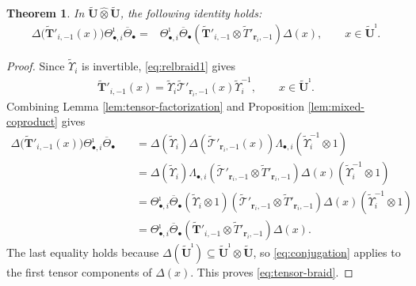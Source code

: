 \documentclass[a4paper,reqno,12pt]{amsart}
\numberwithin{equation}{section}
\newtheorem{theorem}[proposition]{Theorem}
\theoremstyle{definition}
\theoremstyle{plain}
\theoremstyle{definition}
\def\br{\mathbf r}
\def\tU{\widetilde{\mathbf U}}
\def\tUi{\widetilde{\mathbf U}^{\imath}}
\def\tTD{\widetilde T}
\def\tT{\widetilde{\mathscr T}}
\def\tTT{\widetilde{\mathbf T}}
\def\tfX{\widetilde\Upsilon}
\newcommand{\tTa}[1]{\tTT'_{#1,-1}}
\newcommand{\id}{\operatorname{id}}
\begin{document}
\begin{theorem}
\label{thm:tensor}
 In $\tU\widehat{\otimes}\tU$, the following identity holds:
\begin{align}
\Delta\bigl(\tTa{i}(x)\bigr)
\Theta_{\bullet,i}^{\imath}\overline\Theta_\bullet=&\Theta_{\bullet,i}^{\imath}\overline\Theta_\bullet
(\tTa{i}\otimes\tTD'_{\br_i,-1})\Delta(x),
\qquad x\in\tUi.
\label{eq:tensor-braid}
\end{align}
\end{theorem}

\begin{proof}
Since $\tfX_i$ is invertible, \eqref{eq:relbraid1} gives
\begin{align}
\tTa{i}(x)=\tfX_i\tT'_{\br_i,-1}(x)\tfX_i^{-1},
\qquad x\in\tUi.
\label{eq:conjugation}
\end{align}
Combining Lemma \ref{lem:tensor-factorization} and Proposition \ref{lem:mixed-coproduct} gives
\begin{align*}
\Delta\bigl(\tTa{i}(x)\bigr)
\Theta_{\bullet,i}^{\imath}\overline\Theta_\bullet
&\quad=\Delta(\tfX_i)\Delta(\tT'_{\br_i,-1}(x))
\Lambda_{\bullet,i}(\tfX_i^{-1}\otimes1)\\
&\quad=\Delta(\tfX_i)\Lambda_{\bullet,i}
(\tT'_{\br_i,-1}\otimes\tTD'_{\br_i,-1})\Delta(x)
(\tfX_i^{-1}\otimes1)\\
&\quad=\Theta_{\bullet,i}^{\imath}\overline\Theta_\bullet
(\tfX_i\otimes1)
(\tT'_{\br_i,-1}\otimes\tTD'_{\br_i,-1})\Delta(x)
(\tfX_i^{-1}\otimes1)\\
&\quad=\Theta_{\bullet,i}^{\imath}\overline\Theta_\bullet
(\tTa{i}\otimes\tTD'_{\br_i,-1})\Delta(x).
\end{align*}
The last equality holds because
$\Delta(\tUi)\subseteq\tUi\otimes\tU$, so
\eqref{eq:conjugation} applies to the first tensor components of
$\Delta(x)$. This proves \eqref{eq:tensor-braid}.

\end{proof}
\end{document}
